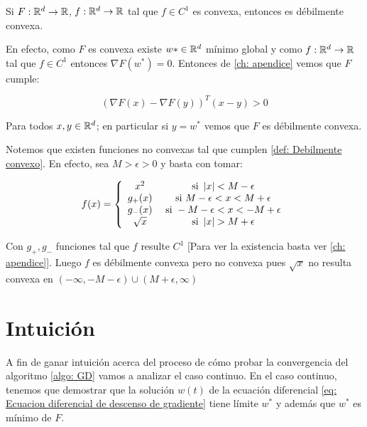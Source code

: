 \begin{remark}
	Si  $F: {\mathbb{R}}^d \rightarrow {\mathbb{R}}$, $f:{\mathbb{R}}^d \rightarrow {\mathbb{R}}$ tal que $f \in C^1$ es convexa, entonces es d\'ebilmente convexa.
	
	En efecto, como $F$ es convexa existe $w* \in {\mathbb{R}}^d$ m\'inimo global y como $f:{\mathbb{R}}^d \rightarrow {\mathbb{R}}$ tal que $f \in C^1$ entonces $\nabla F(w^*) = 0$. Entonces de \ref{ch: apendice} vemos que $F$ cumple:
	
	\begin{equation*}
		\left(\nabla F(x) - \nabla F(y)\right)^T \left(x-y\right) >0
	\end{equation*}
	
	Para todos $x,y \in {\mathbb{R}}^d$; en particular si $y = w^*$ vemos que $F$ es d\'ebilmente convexa.
	
\end{remark}

\begin{remark}
	Notemos que existen funciones no convexas tal que cumplen \ref{def: Debilmente convexo}. En efecto, sea $M > \epsilon >0$ y basta con tomar:
	
	\begin{equation*}
	f(x) = \left\lbrace \begin{array}{cc}
	x^2 & \text{ si } \left\lvert x\right\rvert< M - \epsilon \\
	g_+(x) & \text{ si } M - \epsilon <  x < M + \epsilon \\
	g_-(x) & \text{ si } -M - \epsilon < x < -M + \epsilon \\
	\sqrt{x} & \text{ si } \left\lvert x\right\rvert > M+ \epsilon
	\end{array} \right.
	\end{equation*}
	
	Con $g_+,g_-$ funciones tal que $f$ resulte $C^1$ [Para ver la existencia basta ver \ref{ch: apendice}]. Luego $f$ es d\'ebilmente convexa pero no convexa pues $\sqrt{x}$ no resulta convexa en $\left(- \infty, -M - \epsilon \right) \cup \left(M + \epsilon , \infty\right)$
	
\end{remark}

\section{Intuici\'on}\label{section: Intuicion convergencia puntual batch}

A fin de ganar intuici\'on acerca del proceso de c\'omo probar la convergencia del algoritmo \ref{algo: GD} vamos a analizar el caso continuo. En el caso continuo, tenemos que demostrar que la soluci\'on $w(t)$ de la ecuaci\'on diferencial \ref{eq: Ecuacion diferencial de descenso de gradiente} tiene l\'imite $w^*$ y adem\'as que $w^*$ es m\'inimo de $F$.

